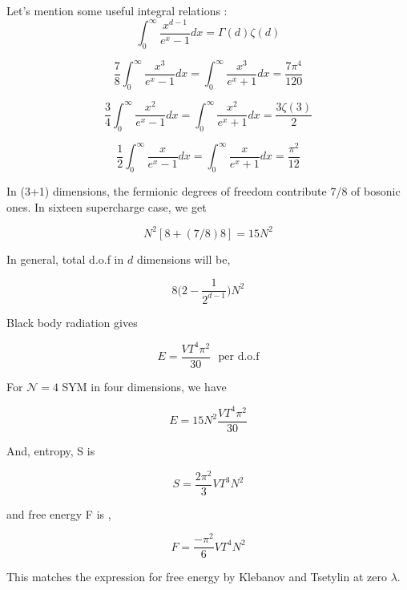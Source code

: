 Let's mention some useful integral relations : 
\begin{equation}
    \int_{0}^{\infty} \frac{x^{d-1}}{e^{x} -1} dx = \Gamma(d)\zeta(d) 
\end{equation}

\begin{equation}
    \frac{7}{8}\int_{0}^{\infty} \frac{x^3}{e^{x} -1} dx = 
    \int_{0}^{\infty} \frac{x^3}{e^{x}+1} dx = \frac{7\pi^4}{120} 
\end{equation}

\begin{equation}
    \frac{3}{4}\int_{0}^{\infty} \frac{x^2}{e^{x} -1} dx = 
    \int_{0}^{\infty} \frac{x^2}{e^{x}+1} dx = \frac{3 \zeta(3)}{2}
\end{equation}

\begin{equation}
    \frac{1}{2}\int_{0}^{\infty} \frac{x}{e^{x} -1} dx = 
    \int_{0}^{\infty} \frac{x}{e^{x}+1} dx = \frac{\pi^2}{12}
\end{equation}


In (3+1) dimensions, the fermionic degrees of freedom contribute 7/8 of bosonic ones. In sixteen supercharge case, 
we get 

\[ N^2 \left[ 8 + (7/8)8 \right] = 15N^2 \] 

In general, total d.o.f in $d$ dimensions will be, 

\[ 8 \Big( 2 - \frac{1}{2^{d-1}}\Big) N^2 \] 


Black body radiation gives 

\begin{equation} 
E = \frac{VT^4 \pi^2}{30} ~~~\text{per d.o.f}
\end{equation} 

For $\mathcal{N}=4$ SYM in four dimensions, we have 

\begin{equation} 
E = 15N^2 \frac{VT^4 \pi^2}{30} 
\end{equation} 


And, entropy, S is 

\begin{equation} 
S = \frac{2\pi^2}{3} VT^3N^2 
\end{equation} 

and free energy F is , 

\begin{equation}
F = \frac{-\pi^2}{6} VT^4N^2 
\end{equation} 

This matches the expression for free energy by Klebanov and Tsetylin at zero $\lambda$. 


